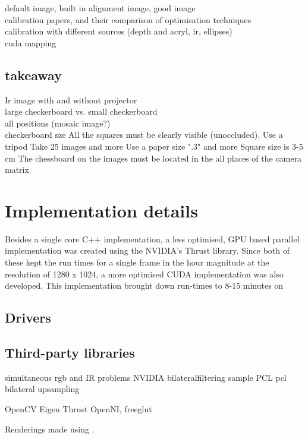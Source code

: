 \documentclass{ucl_thesis}
\begin{document}


default image, built in alignment image, good image\\
calibration papers, and their comparison of optimisation techniques\\
calibration with different sources (depth and acryl, ir, ellipses)\\
cuda mapping\\


\subsection{takeaway}
Ir image with and without projector\\
large checkerboard vs. small checkerboard\\
all positions (mosaic image?)\\
checkerboard sze 
All the squares must be clearly visible (unoccluded).
Use a tripod
Take 25 images and more
Use a paper size ".3" and more
Square size is 3-5 cm
The chessboard on the images must be located in the all places of the camera matrix


\section{Implementation details}
\label{sec:implementation_details}

\par Besides a single core C++ implementation, a less optimised, GPU based parallel implementation was created using the NVIDIA's Thrust library. Since both of these kept the run times for a single frame in the hour magnitude at the resolution of 1280 x 1024, a more optimised CUDA implementation was also developed. This implementation brought down run-times to 8-15 minutes on 

\subsection{Drivers}
\subsection{Third-party libraries}
simultaneous rgb and IR problems
NVIDIA bilateralfiltering sample
PCL
 pcl bilateral upsampling
 \citep{DCBGridStereo}
 
 OpenCV
 Eigen
 Thrust
 OpenNI, freeglut
 
Renderings made using \citep{Meshlab}.
\end{document}

